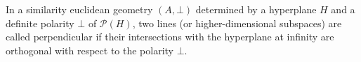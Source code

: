 In a similarity euclidean geometry $(A, \bot)$ determined by a hyperplane $H$ and a definite polarity $\bot$ of $\mathcal{P}(H)$, two lines (or higher-dimensional subspaces) are called perpendicular if their intersections with the hyperplane at infinity are orthogonal with respect to the polarity $\bot$.
